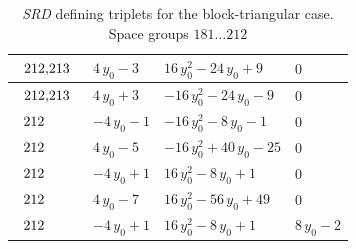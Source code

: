 \begin{table}[H]
\begin{center}
{\begin{tabular}{|l|l|l|l|}
$\begin{tabular}{l}
212,213 \\
\end{tabular}$ & $ 4 \, y_{0} - 3 $ & $ 16 \, y_{0}^{2} - 24 \, y_{0} + 9 $ & $ 0 $ \\ \hline
$\begin{tabular}{l}
212,213 \\
\end{tabular}$ & $ 4 \, y_{0} + 3 $ & $ -16 \, y_{0}^{2} - 24 \, y_{0} - 9 $ & $ 0 $ \\ \hline
$\begin{tabular}{l}
212 \\
\end{tabular}$ & $ -4 \, y_{0} - 1 $ & $ -16 \, y_{0}^{2} - 8 \, y_{0} - 1 $ & $ 0 $ \\ \hline
$\begin{tabular}{l}
212 \\
\end{tabular}$ & $ 4 \, y_{0} - 5 $ & $ -16 \, y_{0}^{2} + 40 \, y_{0} - 25 $ & $ 0 $ \\ \hline
$\begin{tabular}{l}
212 \\
\end{tabular}$ & $ -4 \, y_{0} + 1 $ & $ 16 \, y_{0}^{2} - 8 \, y_{0} + 1 $ & $ 0 $ \\ \hline
$\begin{tabular}{l}
212 \\
\end{tabular}$ & $ 4 \, y_{0} - 7 $ & $ 16 \, y_{0}^{2} - 56 \, y_{0} + 49 $ & $ 0 $ \\ \hline
$\begin{tabular}{l}
212 \\
\end{tabular}$ & $ -4 \, y_{0} + 1 $ & $ 16 \, y_{0}^{2} - 8 \, y_{0} + 1 $ & $ 8 \, y_{0} - 2 $ \\ \hline
\end{tabular}
}
\captionsetup{justification=centering}
\caption{\textit{SRD} defining triplets for the block-triangular case. \\ Space groups $181 \dots212 $}
\label{tab:case1_srdegrees271}
\end{center}
\end{table}

\newpage

